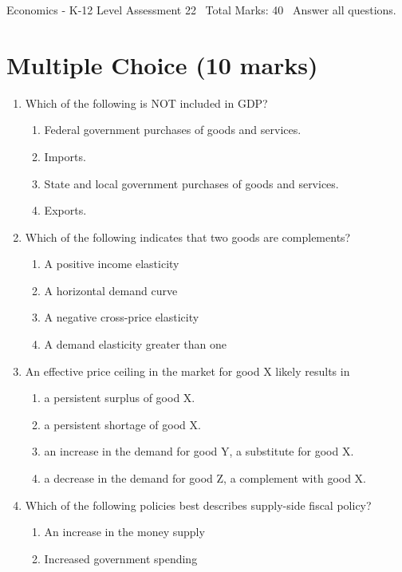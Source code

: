 \documentclass[12pt]{article}
\begin{document}
\begin{center}
Economics - K-12 Level Assessment 22 \
Total Marks: 40 \
Answer all questions.
\end{center}

\section*{Multiple Choice (10 marks)}
\begin{enumerate}[label=\arabic*.]
\item Which of the following is NOT included in GDP?
\begin{enumerate}[label=(\alph*)]
    \item Federal government purchases of goods and services.
    \item Imports.
    \item State and local government purchases of goods and services.
    \item Exports.
\end{enumerate}
\item Which of the following indicates that two goods are complements?
\begin{enumerate}[label=(\alph*)]
    \item A positive income elasticity
    \item A horizontal demand curve
    \item A negative cross-price elasticity
    \item A demand elasticity greater than one
\end{enumerate}
\item An effective price ceiling in the market for good X likely results in
\begin{enumerate}[label=(\alph*)]
    \item a persistent surplus of good X.
    \item a persistent shortage of good X.
    \item an increase in the demand for good Y, a substitute for good X.
    \item a decrease in the demand for good Z, a complement with good X.
\end{enumerate}
\item Which of the following policies best describes supply-side fiscal policy?
\begin{enumerate}[label=(\alph*)]
    \item An increase in the money supply
    \item Increased government spending

\end{enumerate}
\end{enumerate}
\end{document}
